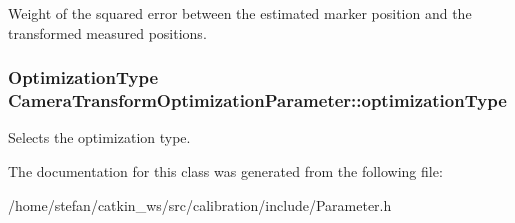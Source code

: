 \-Weight of the squared error between the estimated marker position and the transformed measured positions. \hypertarget{classCameraTransformOptimizationParameter_ac6f12c5a7260847f6a2e3414baf607f0}{
\subsubsection[{optimization\-Type}]{\setlength{\rightskip}{0pt plus 5cm}\-Optimization\-Type {\bf \-Camera\-Transform\-Optimization\-Parameter\-::optimization\-Type}}}\label{classCameraTransformOptimizationParameter_ac6f12c5a7260847f6a2e3414baf607f0}
\-Selects the optimization type. 

\-The documentation for this class was generated from the following file\-:\begin{DoxyCompactItemize}
\item 
/home/stefan/catkin\-\_\-ws/src/calibration/include/\-Parameter.\-h\end{DoxyCompactItemize}
